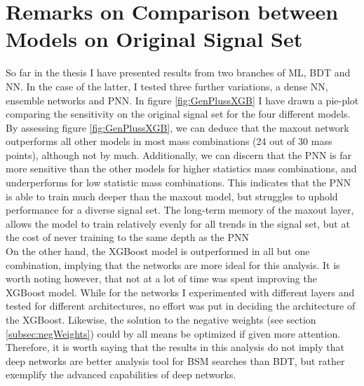 \section{Remarks on Comparison between Models on Original Signal Set}
So far in the thesis I have presented results from two branches of \ac{ML}, \acf{BDT} and \acf{NN}. In the case of the latter, I tested
three further variations, a dense \ac{NN}, ensemble networks and \ac{PNN}. In figure \ref{fig:GenPlussXGB} I have drawn a pie-plot comparing 
the sensitivity on the original signal set for the four different models. By assessing figure \ref{fig:GenPlussXGB}, we can deduce that the 
maxout network outperforms all other models in most mass combinations (24 out of 30 mass points), although not by much. Additionally, we can discern 
that the \ac{PNN} is far more sensitive than the other models for higher statistics mass combinations, and underperforms for low statistic mass combinations.
This indicates that the \ac{PNN} is able to train much deeper than the maxout model, but struggles to uphold performance for a diverse signal set. 
The long-term memory of the maxout layer, allows the model to train relatively evenly for all trends in the signal set, but at the cost of never 
training to the same depth as the \ac{PNN}
\\
On the other hand, the XGBoost model is outperformed in all but one combination, implying that the networks are more ideal for this analysis. 
It is worth noting however, that not at a lot of time was spent improving the XGBoost model. While for the networks I experimented with different layers and 
tested for different architectures, no effort was put in deciding the architecture of the XGBoost. Likewise, the solution to the negative weights (see 
section \ref{subsec:negWeights}) could by all means be optimized if given more attention. Therefore, it is worth saying that the results in this analysis
do not imply that deep networks are better analysis tool for \ac{BSM} searches than \ac{BDT}, but rather exemplify the advanced capabilities of deep networks.
